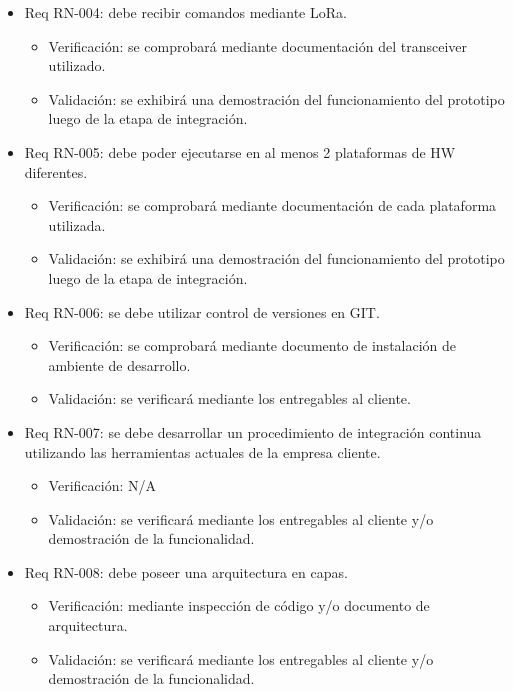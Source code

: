 \documentclass[11pt]{charter}
\begin{document}
\begin{itemize} 
\item Req RN-004: debe recibir comandos mediante LoRa.
\begin{itemize}
\item Verificación: se comprobará mediante documentación del transceiver utilizado. 
\item Validación: se exhibirá una demostración del funcionamiento del prototipo luego de la etapa de integración.  
\end{itemize}
\end{itemize}

\begin{itemize} 
\item Req RN-005: debe poder ejecutarse en al menos 2 plataformas de HW diferentes.
\begin{itemize}
\item Verificación: se comprobará mediante documentación de cada plataforma utilizada. 
\item Validación: se exhibirá una demostración del funcionamiento del prototipo luego de la etapa de integración.  
\end{itemize}
\end{itemize}

\begin{itemize} 
\item Req RN-006: se debe utilizar control de versiones en GIT.
\begin{itemize}
\item Verificación: se comprobará mediante documento de instalación de ambiente de desarrollo. 
\item Validación: se verificará mediante los entregables al cliente.  
\end{itemize}
\end{itemize}

\begin{itemize} 
\item Req RN-007: se debe desarrollar un procedimiento de integración continua utilizando las herramientas actuales de la empresa cliente.
\begin{itemize}
\item Verificación: N/A 
\item Validación: se verificará mediante los entregables al cliente y/o demostración de la funcionalidad. 
\end{itemize}
\end{itemize}

\begin{itemize} 
\item Req RN-008: debe poseer una arquitectura en capas.
\begin{itemize}
\item Verificación: mediante inspección de código y/o documento de arquitectura.
\item Validación: se verificará mediante los entregables al cliente y/o demostración de la funcionalidad.   
\end{itemize}
\end{itemize}
\end{document}
